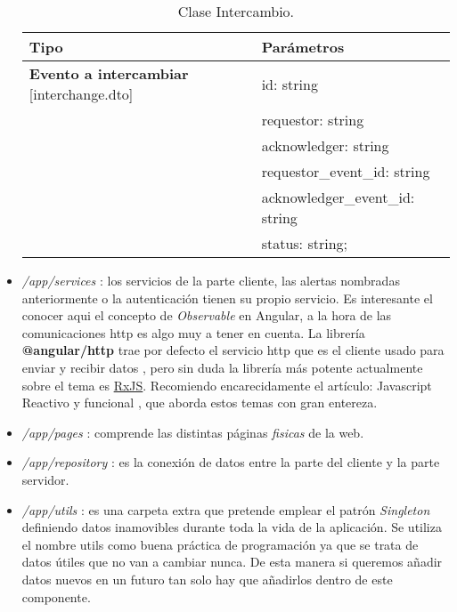 \begin{itemize}
\begin{table}[H]
\centering
\begin{tabular}{|l|l|}
\hline
Tipo  & Parámetros  \\
\hline \hline
\textbf{Evento a intercambiar} [interchange.dto] & id: string \\ 
  & requestor: string \\ 
  & acknowledger: string \\ 
  & requestor\_event\_id: string \\ 
  & acknowledger\_event\_id: string \\ 
  & status: string;  \\ \hline
\end{tabular}
\caption{Clase Intercambio.}
\label{tabla:sencilla2}
\end{table}


	
	
	\item \emph{/app/services} : los servicios de la parte cliente, las alertas nombradas anteriormente o la autenticación tienen su propio servicio. Es interesante el conocer aqui el concepto de \emph{Observable} \cite{ob1} en Angular, a la hora de las comunicaciones http es algo muy a tener en cuenta. La librería \textbf{@angular/http} trae por defecto el servicio http que es el cliente usado para enviar y recibir datos \cite{ob2}, pero sin duda la librería más potente actualmente sobre el tema es \href{http://reactivex.io/rxjs/}{RxJS}. Recomiendo encarecidamente el artículo: Javascript Reactivo y funcional \cite{ob3}, que aborda estos temas con gran entereza.
	
	\item \emph{/app/pages} : comprende las distintas páginas \emph{fisicas} de la web.
	
	\item \emph{/app/repository} : es la conexión de datos entre la parte del cliente y la parte servidor.
	
	
	\item \emph{/app/utils} : es una carpeta extra que pretende emplear el patrón \emph{Singleton} definiendo datos inamovibles durante toda la vida de la aplicación. Se utiliza el nombre utils como buena práctica de programación ya que se trata de datos útiles que no van a cambiar nunca. De esta manera si queremos añadir datos nuevos en un futuro tan solo hay que añadirlos dentro de este componente. 
	

\end{itemize}
